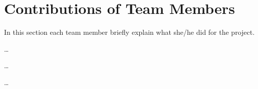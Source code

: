 \section{Contributions of Team Members}

In this section each team member briefly explain what she/he did for the project. 

 \dots

 \dots

 \dots

